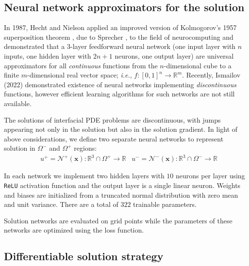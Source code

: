 \documentclass{elsarticle}
\begin{document}
\subsection{Neural network approximators for the solution}

In 1987, Hecht and Nielson \cite{hecht1987kolmogorov} applied an improved version of Kolmogorov's 1957 superposition theorem \cite{kolmogorov1957representation}, due to Sprecher \cite{sprecher1965structure}, to the field of neurocomputing and demonstrated that a $3$-layer feedforward neural network (one input layer with $n$ inputs, one hidden layer with $2n+1$ neurons, one output layer) are universal approximators for all \textit{continuous} functions from the $n$-dimensional cube to a finite $m$-dimensional real vector space; \textit{i.e.}, $f: [0,1]^n \rightarrow \mathbb{R}^m $. Recently, Ismailov (2022) \cite{ismailov2022} demonstrated existence of neural networks implementing \textit{discontinuous} functions, however efficient learning algorithms for such networks are not still available. 

The solutions of interfacial PDE problems are discontinuous, with jumps appearing not only in the solution but also in the solution gradient. In light of above considerations, we define two separate neural networks to represent solution in $\Omega^-$ and $\Omega^+$ regions:
\begin{align*}
& u^+ = \mathcal{N}^+(\mathbf{x}): \mathbb{R}^3\cap \Omega^+ \rightarrow \mathbb{R}  & u^- = \mathcal{N}^-(\mathbf{x}): \mathbb{R}^3\cap \Omega^- \rightarrow \mathbb{R}
\end{align*}

In each network we implement two hidden layers with $10$ neurons per layer using \texttt{ReLU} activation function and the output layer is a single linear neuron. Weights and biases are initialized from a truncated normal distribution with zero mean and unit variance. There are a total of $322$ trainable parameters.

Solution networks are evaluated on grid points while the parameters of these networks are optimized using the loss function.



\subsection{Differentiable solution strategy}
\end{document}
